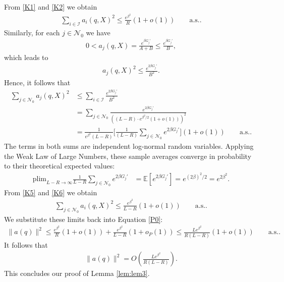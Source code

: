 \documentclass[11pt,a4paper]{article}
\theoremstyle{definition}
\begin{document}
From \eqref{K1} and \eqref{K2} we obtain
\begin{align}
\sum_{i \in \mathcal{I}} a_i(q, X)^2\leq  \frac{e^{\beta^2}}{R}(1+o(1)) \qquad\text{a.s.} \label{K3}.
\end{align}
Similarly, for each $j \in \mathcal{N}_0$ we have
\begin{align}
0< a_j(q, X) = \frac{e^{\beta G_j'}}{A + B} \leq  \frac{e^{\beta G_j'}}{B },
\end{align}
which leads to 
\begin{align}
a_j(q,X)^2 \leq \frac{e^{2\beta G_j'}}{B^2 }.
\end{align}
Hence, it follows that
\begin{align}
\sum_{j \in \mathcal{N}_0} a_j(q, X)^2 &\leq \sum_{i \in \mathcal{I}}\frac{e^{2\beta G_j'}}{B^2 }\\
&= \sum_{j \in \mathcal{N}_0}\frac{e^{2\beta G_j'}}{((L-R) \cdot e^{ \beta^2 / 2} \left( 1 + o(1) \right))^2 }\\
&= \frac{1}{e^{\beta^2} (L-R)} \bigg[\frac{1}{(L-R)} \sum_{j \in \mathcal{N}_0}e^{2\beta G_j'}\bigg](1+o(1)) \qquad\text{a.s.} \label{K5}. 
\end{align}
The terms in both sums are independent log-normal random variables. Applying the Weak Law of Large Numbers, these sample averages converge in probability to their theoretical expected values:
\begin{align}
\text{plim}_{L-R \rightarrow \infty} \frac{1}{L-R} \sum_{j \in \mathcal{N}_0} e^{2 \beta G_j'} &= \mathbb{E}\left[ e^{2 \beta G_j'} \right] = e^{(2\beta)^2 / 2} = e^{2 \beta^2}  \label{K6}.
\end{align}
From \eqref{K5} and \eqref{K6} we obtain
\begin{align}
\sum_{j \in \mathcal{N}_0} a_i(q, X)^2\leq  \frac{e^{\beta^2}}{L-R}(1+o(1)) \qquad\text{a.s.} \label{K3}.
\end{align}
We substitute these limits back into Equation \ref{P0}:
\begin{align}
\|a(q)\|^2 \leq \frac{e^{\beta^2}}{R}(1+o(1)) + \frac{e^{\beta^2}}{L-R}(1+o_P(1))\leq  \frac{Le^{\beta^2}}{R(L-R)} (1+o(1)) \qquad\text{a.s.}.
\end{align}
It follows that
\begin{align}
\|a(q)\|^2 = O\left( \frac{Le^{\beta^2}}{R(L-R)}\right).
\end{align}
This concludes our proof of Lemma \ref{lem:lem3}. 
\end{document}
